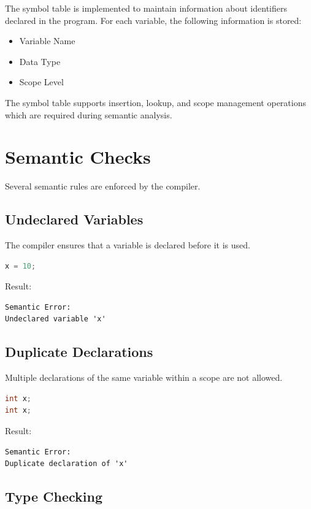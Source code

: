 \documentclass[12pt,a4paper]{report}
\begin{document}
The symbol table is implemented to maintain information about identifiers declared in the program. For each variable, the following information is stored:

\begin{itemize}
    \item Variable Name
    \item Data Type
    \item Scope Level
\end{itemize}

The symbol table supports insertion, lookup, and scope management operations which are required during semantic analysis.

\section{Semantic Checks}

Several semantic rules are enforced by the compiler.

\subsection{Undeclared Variables}

The compiler ensures that a variable is declared before it is used.

\begin{lstlisting}[language=C]
x = 10;
\end{lstlisting}

Result:

\begin{lstlisting}
Semantic Error:
Undeclared variable 'x'
\end{lstlisting}

\subsection{Duplicate Declarations}

Multiple declarations of the same variable within a scope are not allowed.

\begin{lstlisting}[language=C]
int x;
int x;
\end{lstlisting}

Result:

\begin{lstlisting}
Semantic Error:
Duplicate declaration of 'x'
\end{lstlisting}

\subsection{Type Checking}
\end{document}
